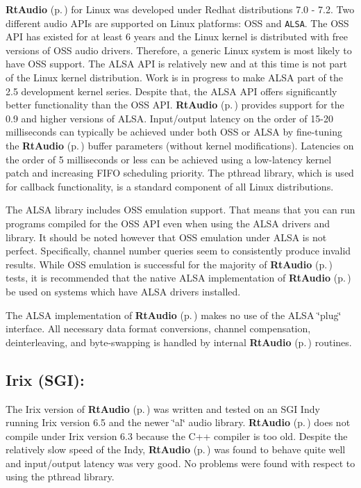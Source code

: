 {\bf Rt\-Audio} {\rm (p.\,\pageref{classRtAudio})} for Linux was developed under Redhat distributions 7.0 - 7.2. Two different audio APIs are supported on Linux platforms: OSS and {\tt ALSA}. The OSS API has existed for at least 6 years and the Linux kernel is distributed with free versions of OSS audio drivers. Therefore, a generic Linux system is most likely to have OSS support. The ALSA API is relatively new and at this time is not part of the Linux kernel distribution. Work is in progress to make ALSA part of the 2.5 development kernel series. Despite that, the ALSA API offers significantly better functionality than the OSS API. {\bf Rt\-Audio} {\rm (p.\,\pageref{classRtAudio})} provides support for the 0.9 and higher versions of ALSA. Input/output latency on the order of 15-20 milliseconds can typically be achieved under both OSS or ALSA by fine-tuning the {\bf Rt\-Audio} {\rm (p.\,\pageref{classRtAudio})} buffer parameters (without kernel modifications). Latencies on the order of 5 milliseconds or less can be achieved using a low-latency kernel patch and increasing FIFO scheduling priority. The pthread library, which is used for callback functionality, is a standard component of all Linux distributions.

The ALSA library includes OSS emulation support. That means that you can run programs compiled for the OSS API even when using the ALSA drivers and library. It should be noted however that OSS emulation under ALSA is not perfect. Specifically, channel number queries seem to consistently produce invalid results. While OSS emulation is successful for the majority of {\bf Rt\-Audio} {\rm (p.\,\pageref{classRtAudio})} tests, it is recommended that the native ALSA implementation of {\bf Rt\-Audio} {\rm (p.\,\pageref{classRtAudio})} be used on systems which have ALSA drivers installed.

The ALSA implementation of {\bf Rt\-Audio} {\rm (p.\,\pageref{classRtAudio})} makes no use of the ALSA \char`\"{}plug\char`\"{} interface. All necessary data format conversions, channel compensation, deinterleaving, and byte-swapping is handled by internal {\bf Rt\-Audio} {\rm (p.\,\pageref{classRtAudio})} routines.

\subsection{Irix (SGI):}\label{irix}


The Irix version of {\bf Rt\-Audio} {\rm (p.\,\pageref{classRtAudio})} was written and tested on an SGI Indy running Irix version 6.5 and the newer \char`\"{}al\char`\"{} audio library. {\bf Rt\-Audio} {\rm (p.\,\pageref{classRtAudio})} does not compile under Irix version 6.3 because the C++ compiler is too old. Despite the relatively slow speed of the Indy, {\bf Rt\-Audio} {\rm (p.\,\pageref{classRtAudio})} was found to behave quite well and input/output latency was very good. No problems were found with respect to using the pthread library.

